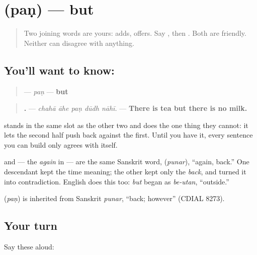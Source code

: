 \section[\texorpdfstring{\mr{पण} (paṇ)}{पण (paṇ)}]{ (paṇ) — but}

\label{lesson:MR-C30-pan}



\begin{quote}
Two joining words are yours: \textbf{} adds, \textbf{} offers. Say \textbf{  }, then \textbf{  }. Both are friendly. Neither can disagree with anything.
\end{quote}

\subsection*{You'll want to know: }
\begin{quote}
\textbf{} — \emph{paṇ} — \textbf{but}
\end{quote}

\begin{quote}
\textbf{    .} — \emph{chahā āhe paṇ dūdh nāhī.} — \textbf{There is tea but there is no milk.}
\end{quote}

\textbf{} stands in the same slot as the other two and does the one thing they cannot: it lets the second half push back against the first. Until you have it, every sentence you can build only agrees with itself.

\textbf{} and \textbf{} — the \emph{again} in \textbf{ } — are the same Sanskrit word, \textbf{} (\emph{punar}), \textquotedblleft{}again, back.\textquotedblright{} One descendant kept the time meaning; the other kept only the \emph{back}, and turned it into contradiction. English does this too: \emph{but} began as \emph{be-utan}, \textquotedblleft{}outside.\textquotedblright{}

\begin{cousinweb}
\textbf{} (\emph{paṇ}) is inherited from Sanskrit \emph{punar}, \textquotedblleft{}back; however\textquotedblright{} (CDIAL 8273).
\end{cousinweb}

\subsection*{Your turn}
Say these aloud:

